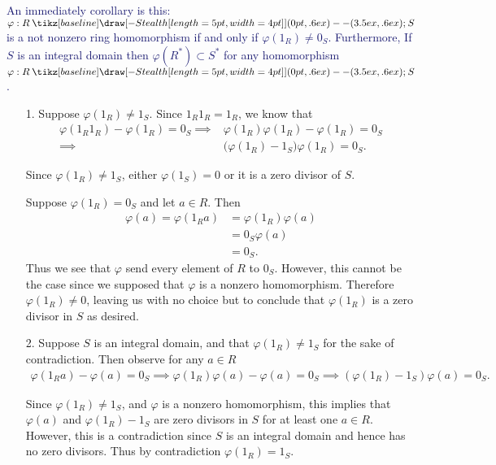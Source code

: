 \documentclass[12pt,letterpaper]{algebra_book}
\renewcommand{\to}{\mathbin{\tikz[baseline] \draw[-{Stealth[length=5pt,width=4pt]}] (0pt,.6ex) -- (3.5ex,.6ex);}}
\renewcommand{\phi}{\varphi}
\theoremstyle{definition}
\begin{document}
    \textcolor{MidnightBlue}{An immediately corollary is this:
    $\phi: R \to S$ is a not nonzero ring homomorphism if and only if
    $\phi(1_R) \ne 0_S$. Furthermore, 
    If
    $S$ is an integral domain then $\phi(R^*) \subset S^*$ for any
    homomorphism $\phi: R \to S$.
    }

    \begin{prf}
        \begin{itemize}
            \item[1.] Suppose $\phi(1_R) \ne 1_S$. Since $1_R1_R =
            1_R$, we know that
            \begin{align*}
                    \phi(1_R1_R) - \phi(1_R) = 0_S
                \implies &
                \phi(1_R)\phi(1_R) - \phi(1_R) = 0_S\\
                \implies & \big(\phi(1_R) - 1_S\big)\phi(1_R) = 0_S.
            \end{align*}

            Since $\phi(1_R) \ne 1_S$, either $\phi(1_S) = 0$ or it is a zero
            divisor of $S$. 

            Suppose $\phi(1_R) = 0_S$ and let $a \in R$. Then
            \begin{align*}
                \phi(a) = \phi(1_Ra) 
                        &= \phi(1_R)\phi(a)\\
                        &= 0_S\phi(a)\\
                        &= 0_S.
            \end{align*}
            Thus we see that $\phi$ send every element of $R$ to $0_S$.
            However, this cannot be the case since we supposed that $\phi$ is a
            nonzero homomorphism. 
Therefore $\phi(1_R)\ne 0$, leaving us with no
            choice but to conclude that $\phi(1_R)$ is a zero divisor in $S$
            as desired.   

            \item[2.]
            Suppose $S$ is an integral domain, and that $\phi(1_R)
            \ne 1_S$ for the sake of contradiction. Then observe
            for any $a \in R$
            \begin{align*}
                \phi(1_R a) - \phi(a) = 0_S \implies \phi(1_R)\phi(a) - \phi(a) = 0_S
                \implies (\phi(1_R) - 1_S)\phi(a) = 0_S.
            \end{align*}

            Since $\phi(1_R) \ne 1_S$, and $\phi$ is a nonzero homomorphism,
            this implies that $\phi(a)$ and $\phi(1_R) - 1_S$ are zero
            divisors in $S$ for at least one $a \in R$. However, this is a
            contradiction since $S$ is an integral domain and hence has no
            zero divisors. Thus by contradiction $\phi(1_R) =
            1_S$.
            

\end{itemize}
\end{prf}
\end{document}
